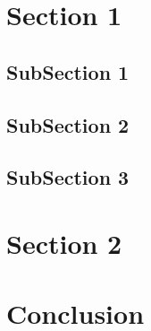 \documentclass[a4paper, 12pt]{article}
\begin{document}
\section{Section 1}

\subsection{SubSection 1}
\subsection{SubSection 2}
\subsection{SubSection 3}

\section{Section 2}

\section{Conclusion}
\end{document}
